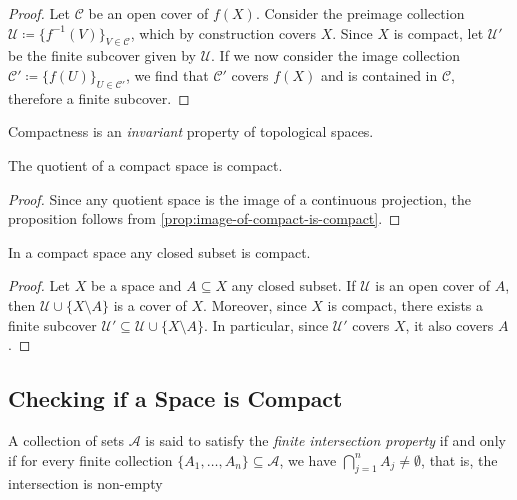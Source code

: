 \begin{proof}
Let \(\mathcal{C}\) be an open cover of \(f(X)\). Consider the preimage
collection \(\mathcal{U} \coloneq \{f^{-1}(V)\}_{V \in \mathcal{C}}\), which by
construction covers \(X\). Since \(X\) is compact, let \(\mathcal{U}'\) be the
finite subcover given by \(\mathcal{U}\). If we now consider the image
collection \(\mathcal{C}' \coloneq \{f(U)\}_{U \in \mathcal{C}'}\), we find that
\(\mathcal{C}'\) covers \(f(X)\) and is contained in \(\mathcal{C}\), therefore
a finite subcover.
\end{proof}

\begin{corollary}
\label{cor:compactness-topological-invariant}
Compactness is an \emph{invariant} property of topological spaces.
\end{corollary}

\begin{corollary}
\label{cor:quotient-of-compact-space-is-compact}
The quotient of a compact space is compact.
\end{corollary}

\begin{proof}
Since any quotient space is the image of a continuous projection, the
proposition follows from \cref{prop:image-of-compact-is-compact}.
\end{proof}

\begin{proposition}
\label{prop:closed-subset-compact}
In a compact space any closed subset is compact.
\end{proposition}

\begin{proof}
Let \(X\) be a space and \(A \subseteq X\) any closed subset. If \(\mathcal{U}\)
is an open cover of \(A\), then \(\mathcal{U} \cup \{X \setminus A\}\) is a
cover of \(X\). Moreover, since \(X\) is compact, there exists a finite subcover
\(\mathcal{U}' \subseteq \mathcal{U} \cup \{X \setminus A\}\). In particular,
since \(\mathcal{U}'\) covers \(X\), it also covers \(A\).
\end{proof}

\subsection{Checking if a Space is Compact}

\begin{definition}
\label{def:finite-intersection-property}
A collection of sets \(\mathcal{A}\) is said to satisfy the
\emph{finite intersection property} if and only if for every finite collection
\(\{A_1, \dots, A_n\} \subseteq \mathcal{A}\), we have
\(\bigcap_{j=1}^n A_j \neq \emptyset\), that is, the intersection is non-empty
\end{definition}


